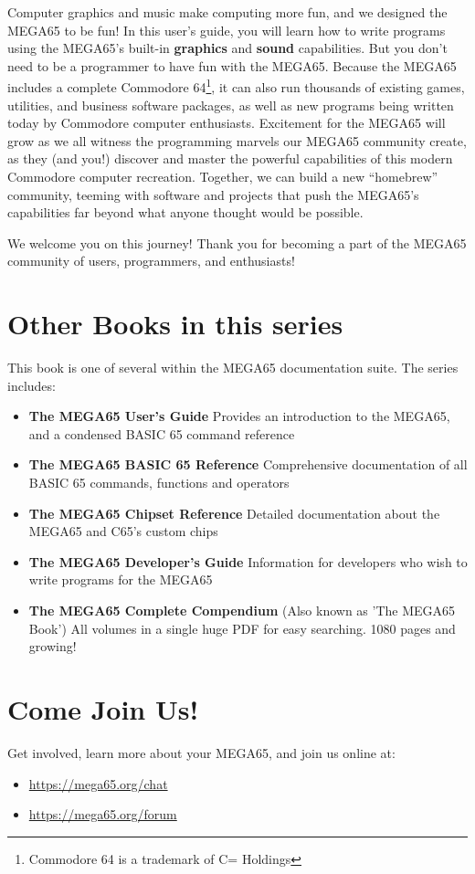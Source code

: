 Computer graphics and music make computing more fun, and we designed the MEGA65 to be fun! In this user's guide, you will learn how to write programs using the MEGA65's built-in {\bf graphics} and {\bf sound} capabilities. But you don't need to be a programmer to have fun with the MEGA65. Because the MEGA65 includes a complete Commodore{\textregistered} 64{\texttrademark}\footnote{Commodore 64 is a trademark of C= Holdings}, it can also run thousands of existing games, utilities, and business software packages, as well as new programs being written today by Commodore computer enthusiasts. Excitement for the MEGA65 will grow as we all witness the programming marvels our MEGA65 community create, as they (and you!) discover and master the powerful capabilities of this modern Commodore computer recreation. Together, we can build a new ``homebrew'' community, teeming with software and projects that push the MEGA65's capabilities far beyond what anyone thought would be possible.

We welcome you on this journey! Thank you for becoming a part of the MEGA65
community of users, programmers, and enthusiasts!

\section{Other Books in this series}

This book is one of several within the MEGA65 documentation suite. The series includes:

\begin{itemize}
  \item {\bf The MEGA65 User's Guide} \newline
      Provides an introduction to the MEGA65, and a condensed BASIC 65 command reference
    \item {\bf The MEGA65 BASIC 65 Reference} \newline
      Comprehensive documentation of all BASIC 65 commands, functions and operators
    \item {\bf The MEGA65 Chipset Reference} \newline
      Detailed documentation about the MEGA65 and C65's custom chips
    \item {\bf The MEGA65 Developer's Guide} \newline
      Information for developers who wish to write programs for the MEGA65
    \item {\bf The MEGA65 Complete Compendium} \newline
      (Also known as 'The MEGA65 Book') \newline
      All volumes in a single huge PDF for easy searching. 1080 pages and growing!
\end{itemize}

\section{Come Join Us!}
Get involved, learn more about your MEGA65, and join us online at:

\begin{itemize}
    \item \url{https://mega65.org/chat}
    \item \url{https://mega65.org/forum}
\end{itemize}
